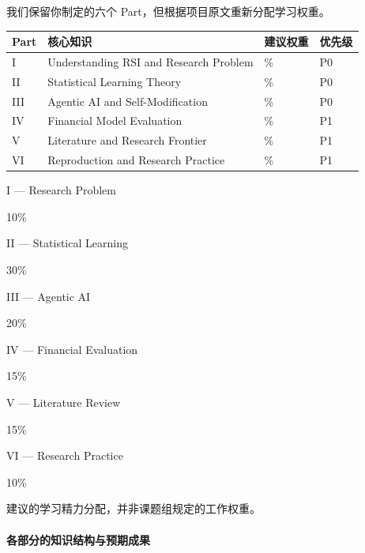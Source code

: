 我们保留你制定的六个 Part，但根据项目原文重新分配学习权重。

\begin{readertable}
\begin{longtable}[]{@{}
  >{\raggedright\arraybackslash}p{}
  >{\raggedright\arraybackslash}p{}
  >{\raggedleft\arraybackslash}p{}
  >{\raggedright\arraybackslash}p{}@{}}
\toprule
Part & 核心知识 & 建议权重 & 优先级 \\
\midrule
\endhead
I & Understanding RSI and Research Problem & 10\% & P0 \\
II & Statistical Learning Theory & 30\% & P0 \\
III & Agentic AI and Self-Modification & 20\% & P0 \\
IV & Financial Model Evaluation & 15\% & P1 \\
V & Literature and Research Frontier & 15\% & P1 \\
VI & Reproduction and Research Practice & 10\% & P1 \\
\bottomrule
\end{longtable}
\end{readertable}

I --- Research Problem

10\%

II --- Statistical Learning

30\%

III --- Agentic AI

20\%

IV --- Financial Evaluation

15\%

V --- Literature Review

15\%

VI --- Research Practice

10\%

建议的学习精力分配，并非课题组规定的工作权重。

\hypertarget{part-1-07-0001-ux5404ux90e8ux5206ux7684ux77e5ux8bc6ux7ed3ux6784ux4e0eux9884ux671fux6210ux679c}{%
\paragraph{各部分的知识结构与预期成果}\label{part-1-07-0001-ux5404ux90e8ux5206ux7684ux77e5ux8bc6ux7ed3ux6784ux4e0eux9884ux671fux6210ux679c}}

